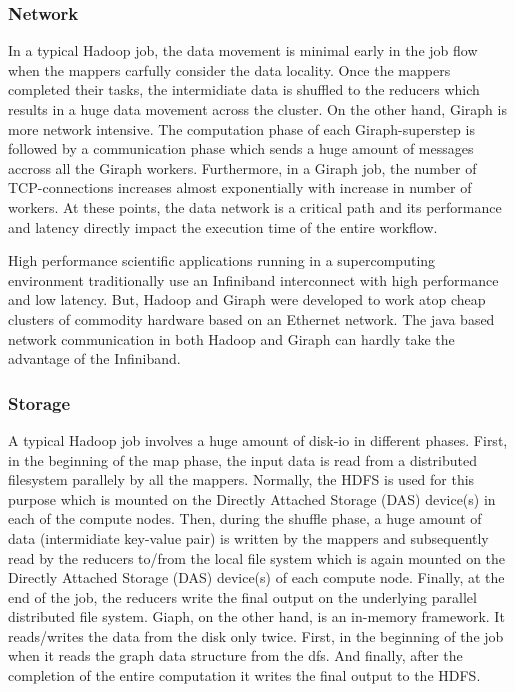 \documentclass[conference]{IEEEtran}
\begin{document}
\subsubsection {Network}
In a typical Hadoop job, the data movement is minimal early in the job flow when the mappers carfully consider the data locality. 
Once the mappers completed their tasks, the intermidiate data is shuffled to the reducers which results in a huge data movement across the cluster. 
On the other hand,  Giraph is more network intensive. The computation phase of each Giraph-superstep is followed by a communication phase which sends a huge amount of messages accross all the Giraph workers.
Furthermore, in a Giraph job, the number of TCP-connections increases almost exponentially with increase in number of workers.
At these points, the data network is a critical path and its performance and latency directly impact the execution time of the entire workflow.

High performance scientific applications running in a supercomputing environment traditionally use an Infiniband interconnect with high performance and low latency.
But, Hadoop and Giraph were developed to work atop cheap clusters of commodity hardware based on an Ethernet network.
The java based network communication in both Hadoop and Giraph can hardly take the advantage of the Infiniband.

\subsubsection {Storage}
A typical Hadoop job involves a huge amount of disk-io in different phases. 
First, in the beginning of the map phase, the input data is read from a distributed filesystem parallely by all the mappers.
Normally, the HDFS is used for this purpose which is mounted on the Directly Attached Storage (DAS) device(s) in each of the compute nodes. 
Then, during the shuffle phase, a huge amount of data (intermidiate key-value pair) is written by the mappers and subsequently read by the reducers to/from the local file system which is again mounted on the Directly Attached Storage (DAS) device(s) of each compute node.
Finally, at the end of the job, the reducers write the final output on the underlying parallel distributed file system.
Giaph, on the other hand, is an in-memory framework. It reads/writes the data from the disk only twice. First, in the beginning of the job when it reads the graph data structure from the dfs. And finally, after the completion of the entire computation it writes the final output to the HDFS.
\end{document}
